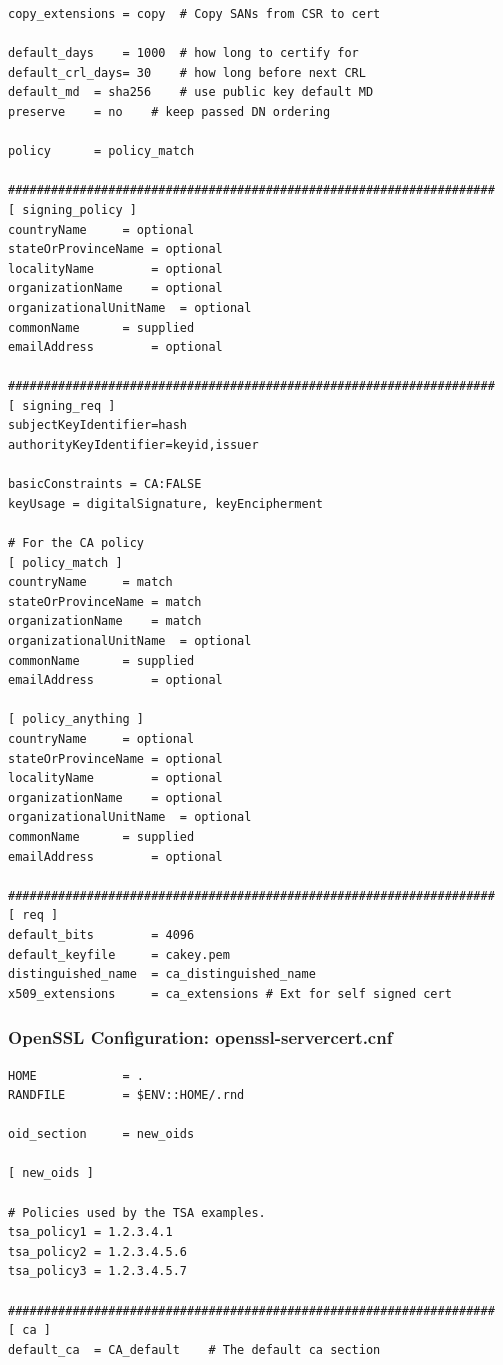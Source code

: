 \documentclass[a4paper,12pt]{article}
\begin{document}
{{\begin{verbatim}
copy_extensions = copy	# Copy SANs from CSR to cert

default_days    = 1000	# how long to certify for
default_crl_days= 30	# how long before next CRL
default_md  = sha256	# use public key default MD
preserve    = no	# keep passed DN ordering

policy		= policy_match

####################################################################
[ signing_policy ]
countryName     = optional
stateOrProvinceName = optional
localityName        = optional
organizationName    = optional
organizationalUnitName  = optional
commonName      = supplied
emailAddress        = optional

####################################################################
[ signing_req ]
subjectKeyIdentifier=hash
authorityKeyIdentifier=keyid,issuer

basicConstraints = CA:FALSE
keyUsage = digitalSignature, keyEncipherment

# For the CA policy
[ policy_match ]
countryName		= match
stateOrProvinceName	= match
organizationName	= match
organizationalUnitName	= optional
commonName		= supplied
emailAddress		= optional

[ policy_anything ]
countryName		= optional
stateOrProvinceName	= optional
localityName		= optional
organizationName	= optional
organizationalUnitName	= optional
commonName		= supplied
emailAddress		= optional

####################################################################
[ req ]
default_bits        = 4096
default_keyfile     = cakey.pem
distinguished_name  = ca_distinguished_name
x509_extensions     = ca_extensions	# Ext for self signed cert
\end{verbatim}
\newpage 
\subsubsection{OpenSSL Configuration: openssl-servercert.cnf}
\begin{verbatim}
HOME			= .
RANDFILE		= $ENV::HOME/.rnd

oid_section		= new_oids

[ new_oids ]

# Policies used by the TSA examples.
tsa_policy1 = 1.2.3.4.1
tsa_policy2 = 1.2.3.4.5.6
tsa_policy3 = 1.2.3.4.5.7

####################################################################
[ ca ]
default_ca	= CA_default	# The default ca section


\end{verbatim}}}
\end{document}
